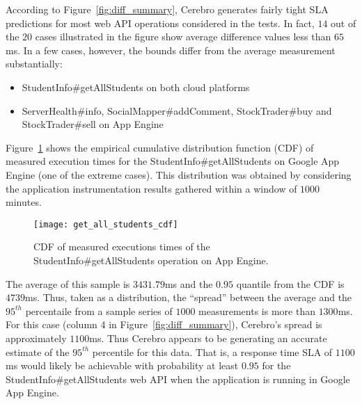 According to Figure~\ref{fig:diff_summary}, Cerebro generates fairly tight SLA predictions for most web API operations considered in the tests. In fact,
$14$ out of the $20$ cases illustrated in the figure show average difference
values less than $65$ms. In a few cases, however, the bounds differ from the
average measurement substantially:

\begin{itemize}
\item StudentInfo\#getAllStudents on both cloud platforms
\item ServerHealth\#info, SocialMapper\#addComment, StockTrader\#buy and StockTrader\#sell on App Engine
\end{itemize}


Figure~\ref{fig:get_all_students_cdf} shows the empirical cumulative
distribution function (CDF) of measured execution times for the 
StudentInfo\#getAllStudents on
Google App Engine (one of the extreme cases). 
This distribution was obtained by considering the application instrumentation 
results gathered within a window of $1000$ minutes. 
\begin{figure}
\centering
\texttt{[image: get\_all\_students\_cdf]}
\caption{CDF of measured executions times of the StudentInfo\#getAllStudents operation on App Engine.}
\label{fig:get_all_students_cdf}
\end{figure}

The average of this sample is $3431.79$ms and the $0.95$ quantile
from the CDF is $4739$ms.  Thus, taken as a distribution, the ``spread''
between the average and the $95^{th}$ percentaile from a sample series of
$1000$ measurements is more
than $1300$ms.  For this case (column 4 in Figure~\ref{fig:diff_summary}), Cerebro's
spread is approximately $1100$ms.  Thus Cerebro appears to be generating an
accurate estimate of the $95^{th}$ percentile for this data.  That is, a
response time SLA of $1100$ms would likely be achievable with probability
at least $0.95$ 
for the StudentInfo\#getAllStudents web API when the application is
running in Google App Engine. 

